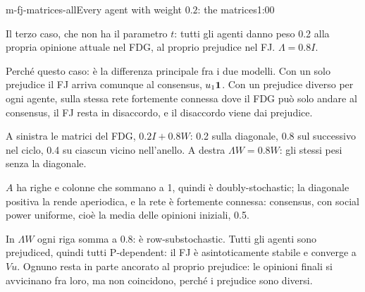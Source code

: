 \begin{slide}{m-fj-matrices-all}{Every agent with weight $0.2$: the matrices}{1:00}
  \begin{discorso}
    \item Il terzo caso, che non ha il parametro $t$: tutti gli agenti danno peso 0.2 alla propria opinione attuale nel FDG, al proprio prejudice nel FJ. $\Lambda=0.8I$.
    \item Perché questo caso: è la differenza principale fra i due modelli. Con un solo prejudice il FJ arriva comunque al consensus, $u_1\mathbf{1}$. Con un prejudice diverso per ogni agente, sulla stessa rete fortemente connessa dove il FDG può solo andare al consensus, il FJ resta in disaccordo, e il disaccordo viene dai prejudice.
    \item A sinistra le matrici del FDG, $0.2I+0.8W$: 0.2 sulla diagonale, 0.8 sul successivo nel ciclo, 0.4 su ciascun vicino nell'anello. A destra $\Lambda W=0.8W$: gli stessi pesi senza la diagonale.
    \item $A$ ha righe e colonne che sommano a 1, quindi è doubly-stochastic; la diagonale positiva la rende aperiodica, e la rete è fortemente connessa: consensus, con social power uniforme, cioè la media delle opinioni iniziali, 0.5.
    \item In $\Lambda W$ ogni riga somma a 0.8: è row-substochastic. Tutti gli agenti sono prejudiced, quindi tutti P-dependent: il FJ è asintoticamente stabile e converge a $Vu$. Ognuno resta in parte ancorato al proprio prejudice: le opinioni finali si avvicinano fra loro, ma non coincidono, perché i prejudice sono diversi.
  \end{discorso}
\end{slide}

